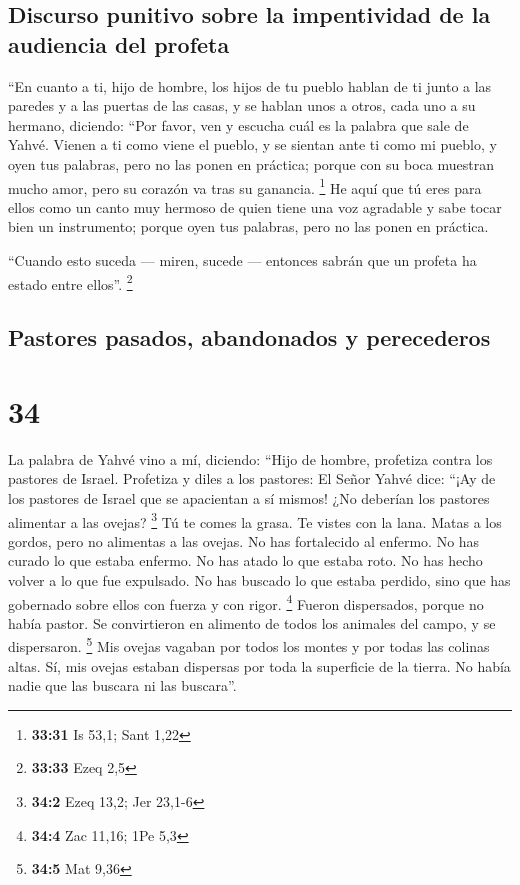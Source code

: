 \hypertarget{discurso-punitivo-sobre-la-impentividad-de-la-audiencia-del-profeta}{%
\subsection{Discurso punitivo sobre la impentividad de la audiencia del
profeta}\label{discurso-punitivo-sobre-la-impentividad-de-la-audiencia-del-profeta}}

 ``En cuanto a ti, hijo de hombre, los hijos de tu pueblo
hablan de ti junto a las paredes y a las puertas de las casas, y se
hablan unos a otros, cada uno a su hermano, diciendo: ``Por favor, ven y
escucha cuál es la palabra que sale de Yahvé.  Vienen a
ti como viene el pueblo, y se sientan ante ti como mi pueblo, y oyen tus
palabras, pero no las ponen en práctica; porque con su boca muestran
mucho amor, pero su corazón va tras su ganancia. \footnote{\textbf{33:31}
  Is 53,1; Sant 1,22}  He aquí que tú eres para ellos
como un canto muy hermoso de quien tiene una voz agradable y sabe tocar
bien un instrumento; porque oyen tus palabras, pero no las ponen en
práctica.

 ``Cuando esto suceda --- miren, sucede --- entonces
sabrán que un profeta ha estado entre ellos''. \footnote{\textbf{33:33}
  Ezeq 2,5}

\hypertarget{pastores-pasados-abandonados-y-perecederos}{%
\subsection{Pastores pasados, abandonados y
perecederos}\label{pastores-pasados-abandonados-y-perecederos}}

\hypertarget{section-33}{%
\section{34}\label{section-33}}

 La palabra de Yahvé vino a mí, diciendo: 
``Hijo de hombre, profetiza contra los pastores de Israel. Profetiza y
diles a los pastores: El Señor Yahvé dice: ``¡Ay de los pastores de
Israel que se apacientan a sí mismos! ¿No deberían los pastores
alimentar a las ovejas? \footnote{\textbf{34:2} Ezeq 13,2; Jer 23,1-6}
 Tú te comes la grasa. Te vistes con la lana. Matas a los
gordos, pero no alimentas a las ovejas.  No has
fortalecido al enfermo. No has curado lo que estaba enfermo. No has
atado lo que estaba roto. No has hecho volver a lo que fue expulsado. No
has buscado lo que estaba perdido, sino que has gobernado sobre ellos
con fuerza y con rigor. \footnote{\textbf{34:4} Zac 11,16; 1Pe 5,3}
 Fueron dispersados, porque no había pastor. Se
convirtieron en alimento de todos los animales del campo, y se
dispersaron. \footnote{\textbf{34:5} Mat 9,36}  Mis ovejas
vagaban por todos los montes y por todas las colinas altas. Sí, mis
ovejas estaban dispersas por toda la superficie de la tierra. No había
nadie que las buscara ni las buscara''.

